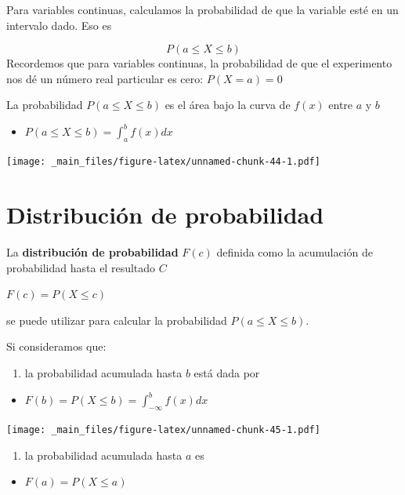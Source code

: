 \documentclass[
]{book}
\providecommand{\tightlist}{%
  \setlength{\itemsep}{0pt}\setlength{\parskip}{0pt}}
\begin{document}
Para variables continuas, calculamos la probabilidad de que la variable esté en un intervalo dado. Eso es

\[P( a \leq X \leq b)\]
Recordemos que para variables continuas, la probabilidad de que el experimento nos dé un número real particular es cero: \(P(X= a)= 0\)

La probabilidad \(P( a \leq X \leq b)\) es el área bajo la curva de \(f(x)\) entre \(a\) y \(b\)

\begin{itemize}
\tightlist
\item
  \(P( a \leq X \leq b) = \int_{a}^{b} f(x) dx\)
\end{itemize}

\texttt{[image: \_main\_files/figure-latex/unnamed-chunk-44-1.pdf]}

\hypertarget{distribuciuxf3n-de-probabilidad-1}{%
\section{Distribución de probabilidad}\label{distribuciuxf3n-de-probabilidad-1}}

La \textbf{distribución de probabilidad} \(F(c)\) definida como la acumulación de probabilidad hasta el resultado \(C\)

\(F(c) = P( X \leq c)\)

se puede utilizar para calcular la probabilidad \(P( a \leq X \leq b)\).

Si consideramos que:

\begin{enumerate}
\def\labelenumi{\arabic{enumi})}
\tightlist
\item
  la probabilidad acumulada hasta \(b\) está dada por
\end{enumerate}

\begin{itemize}
\tightlist
\item
  \(F(b) = P( X \leq b)=\int_{-\infty }^bf(x)dx\)
\end{itemize}

\texttt{[image: \_main\_files/figure-latex/unnamed-chunk-45-1.pdf]}

\begin{enumerate}
\def\labelenumi{\arabic{enumi})}
\setcounter{enumi}{1}
\tightlist
\item
  la probabilidad acumulada hasta \(a\) es
\end{enumerate}

\begin{itemize}
\tightlist
\item
  \(F(a) = P( X \leq a)\)
\end{itemize}
\end{document}
